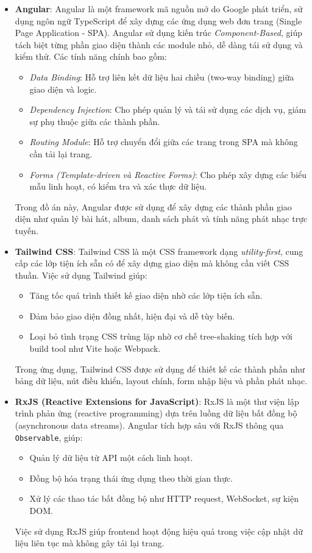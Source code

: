 \begin{itemize}

    \item \textbf{Angular}:
    Angular là một framework mã nguồn mở do Google phát triển, sử dụng ngôn ngữ TypeScript để xây dựng các ứng dụng web đơn trang (Single Page Application - SPA). Angular sử dụng kiến trúc \textit{Component-Based}, giúp tách biệt từng phần giao diện thành các module nhỏ, dễ dàng tái sử dụng và kiểm thử. Các tính năng chính bao gồm:
    \begin{itemize}
        \item \textit{Data Binding}: Hỗ trợ liên kết dữ liệu hai chiều (two-way binding) giữa giao diện và logic.
        \item \textit{Dependency Injection}: Cho phép quản lý và tái sử dụng các dịch vụ, giảm sự phụ thuộc giữa các thành phần.
        \item \textit{Routing Module}: Hỗ trợ chuyển đổi giữa các trang trong SPA mà không cần tải lại trang.
        \item \textit{Forms (Template-driven và Reactive Forms)}: Cho phép xây dựng các biểu mẫu linh hoạt, có kiểm tra và xác thực dữ liệu.
    \end{itemize}
    Trong đồ án này, Angular được sử dụng để xây dựng các thành phần giao diện như quản lý bài hát, album, danh sách phát và tính năng phát nhạc trực tuyến.

    \item \textbf{Tailwind CSS}:
    Tailwind CSS là một CSS framework dạng \textit{utility-first}, cung cấp các lớp tiện ích sẵn có để xây dựng giao diện mà không cần viết CSS thuần. Việc sử dụng Tailwind giúp:
    \begin{itemize}
        \item Tăng tốc quá trình thiết kế giao diện nhờ các lớp tiện ích sẵn.
        \item Đảm bảo giao diện đồng nhất, hiện đại và dễ tùy biến.
        \item Loại bỏ tình trạng CSS trùng lặp nhờ cơ chế tree-shaking tích hợp với build tool như Vite hoặc Webpack.
    \end{itemize}
    Trong ứng dụng, Tailwind CSS được sử dụng để thiết kế các thành phần như bảng dữ liệu, nút điều khiển, layout chính, form nhập liệu và phần phát nhạc.

    \item \textbf{RxJS (Reactive Extensions for JavaScript)}:
    RxJS là một thư viện lập trình phản ứng (reactive programming) dựa trên luồng dữ liệu bất đồng bộ (asynchronous data streams). Angular tích hợp sâu với RxJS thông qua \texttt{Observable}, giúp:
    \begin{itemize}
        \item Quản lý dữ liệu từ API một cách linh hoạt.
        \item Đồng bộ hóa trạng thái ứng dụng theo thời gian thực.
        \item Xử lý các thao tác bất đồng bộ như HTTP request, WebSocket, sự kiện DOM.
    \end{itemize}
    Việc sử dụng RxJS giúp frontend hoạt động hiệu quả trong việc cập nhật dữ liệu liên tục mà không gây tải lại trang.


\end{itemize}
